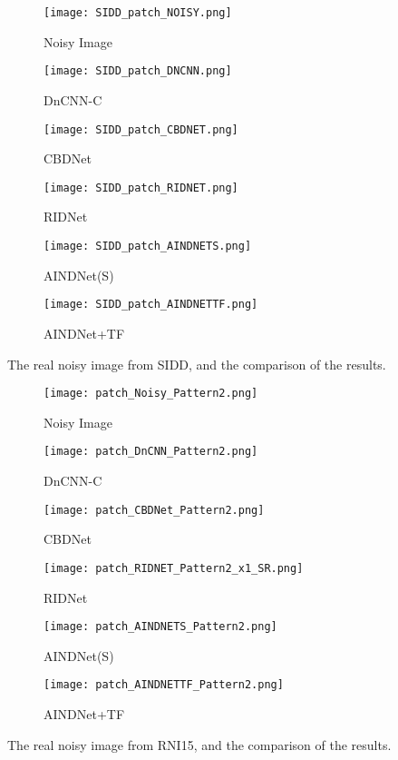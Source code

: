 \documentclass[10pt,twocolumn,letterpaper]{article}
\begin{document}
\begin{figure}[t]
	\centering	
	\begin{subfigure}[b]{0.30\linewidth}		
		\texttt{[image: SIDD\_patch\_NOISY.png]} 
		\caption{Noisy Image}		
	\end{subfigure}	
	\begin{subfigure}[b]{0.30\linewidth}		
		\texttt{[image: SIDD\_patch\_DNCNN.png]}
		\caption{DnCNN-C}		
	\end{subfigure}	
	\begin{subfigure}[b]{0.30\linewidth}		
		\texttt{[image: SIDD\_patch\_CBDNET.png]}
		\caption{CBDNet}		
	\end{subfigure}	
	\begin{subfigure}[b]{0.30\linewidth}		
		\texttt{[image: SIDD\_patch\_RIDNET.png]} 
		\caption{RIDNet}		
	\end{subfigure}	
	\begin{subfigure}[b]{0.30\linewidth}		
		\texttt{[image: SIDD\_patch\_AINDNETS.png]}
		\caption{AINDNet(S)}		
	\end{subfigure}	
	\begin{subfigure}[b]{0.30\linewidth}		
		\texttt{[image: SIDD\_patch\_AINDNETTF.png]}
		\caption{AINDNet+TF}		
	\end{subfigure}	
	\caption{The real noisy image from SIDD, and the comparison of the results.}
	\label{fig:comparison3}	
	
	
	\begin{subfigure}[b]{0.30\linewidth}		
		\texttt{[image: patch\_Noisy\_Pattern2.png]} 
		\caption{Noisy Image}		
	\end{subfigure}	
	\begin{subfigure}[b]{0.30\linewidth}		
		\texttt{[image: patch\_DnCNN\_Pattern2.png]}
		\caption{DnCNN-C}		
	\end{subfigure}	
	\begin{subfigure}[b]{0.30\linewidth}		
		\texttt{[image: patch\_CBDNet\_Pattern2.png]}
		\caption{CBDNet}		
	\end{subfigure}	
	\begin{subfigure}[b]{0.30\linewidth}		
		\texttt{[image: patch\_RIDNET\_Pattern2\_x1\_SR.png]} 
		\caption{RIDNet}		
	\end{subfigure}	
	\begin{subfigure}[b]{0.30\linewidth}		
		\texttt{[image: patch\_AINDNETS\_Pattern2.png]}
		\caption{AINDNet(S)}		
	\end{subfigure}	
	\begin{subfigure}[b]{0.30\linewidth}		
		\texttt{[image: patch\_AINDNETTF\_Pattern2.png]}
		\caption{AINDNet+TF}		
	\end{subfigure}	
	\caption{The real noisy image from RNI15, and the comparison of the results.}
	\label{fig:comparison}	
\end{figure}
\end{document}
